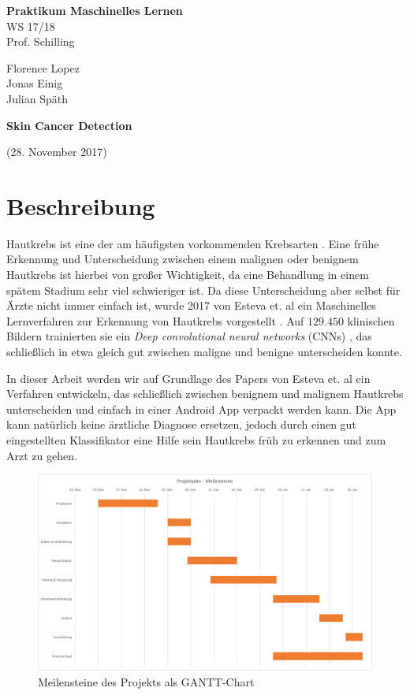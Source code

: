\documentclass[%
   10pt,              %
   a4paper,           %
   DIV10,             %
]{scrartcl}%
\def\header#1#2#3#4#5#6{\pagestyle{empty}
\noindent
\begin{minipage}[t]{0.6\textwidth}
\begin{flushleft}
\textbf{#4}\\%
#6\\%
#2  %
\end{flushleft}
\end{minipage}
\begin{minipage}[t]{0.4\textwidth}
\begin{flushright}
\vspace*{0.2cm}
#5%
\end{flushright}
\end{minipage}

\begin{center}
{\Large\textbf{ #1}} %

{(#3)} %
\end{center}
}
\begin{document}
\header{Skin Cancer Detection}{Prof. Schilling}{28. November 2017}{Praktikum Maschinelles Lernen}{Florence Lopez \\ Jonas Einig \\ Julian Späth}{WS 17/18}

\section*{Beschreibung}
Hautkrebs ist eine der am häufigsten vorkommenden Krebsarten \cite{cancer}. Eine frühe Erkennung und Unterscheidung zwischen einem malignen oder benignem Hautkrebs ist hierbei von großer Wichtigkeit, da eine Behandlung in einem spätem Stadium sehr viel schwieriger ist. Da diese Unterscheidung aber selbst für Ärzte nicht immer einfach ist, wurde 2017 von Esteva et. al ein Maschinelles Lernverfahren zur Erkennung von Hautkrebs vorgestellt \cite{skincancer}. Auf $129.450$ klinischen Bildern trainierten sie ein \textit{Deep convolutional neural networks} (CNNs) \cite{cnn}, das schließlich in etwa gleich gut zwischen maligne und benigne unterscheiden konnte.  

In dieser Arbeit werden wir auf Grundlage des Papers von Esteva et. al ein Verfahren entwickeln, das schließlich zwischen benignem und malignem Hautkrebs unterscheiden und einfach in einer Android App verpackt werden kann. Die App kann natürlich keine ärztliche Diagnose ersetzen, jedoch durch einen gut eingestellten Klassifikator eine Hilfe sein Hautkrebs früh zu erkennen und zum Arzt zu gehen. 

 \begin{figure}[ht]
	\centering
 \includegraphics[width=\textwidth]{fig/gantt_projektplan}
 \caption{Meilensteine des Projekts als GANTT-Chart}
	\label{fig_gantt}
 \end{figure}
\end{document}
